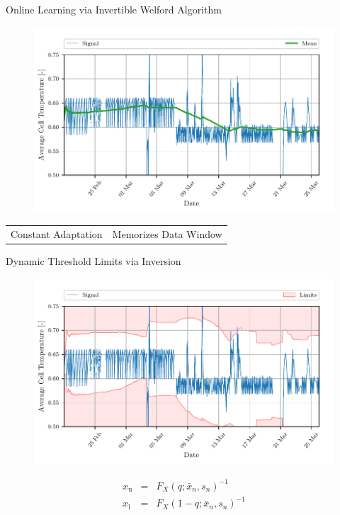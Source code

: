 \documentclass[aspectratio=169]{beamer}
\newcommand{\ui}[2]{#1 _{\mathrm{#2}}}
\begin{document}
\begin{frame}{Online Learning via Invertible Welford Algorithm}
    \begin{figure}
        \begin{center}
            \includegraphics[width=0.62\linewidth]{../ilustrate/pc2023/bess/rmean_signal.pdf}
        \end{center}
    \end{figure}

    \centering
    \begin{tabular}{c|c}
        {\color{green}{$+$}} Constant Adaptation & {\color{red}{$-$}} Memorizes Data Window \\
    \end{tabular}
\end{frame}

\begin{frame}{Dynamic Threshold Limits via Inversion}
    \begin{figure}
        \begin{center}
            \includegraphics[width=0.62\linewidth]{../ilustrate/pc2023/bess/thresh_unsupervised_thresh.pdf}
        \end{center}
    \end{figure}
    \begin{eqnarray}
        \ui{x}{u}&=&F_{X}(q; \bar x_n, s_n)^{-1}\nonumber \\
        \ui{x}{l}&=&F_{X}(1 - q; \bar x_n, s_n)^{-1}\nonumber
    \end{eqnarray}

\end{frame}
\end{document}
